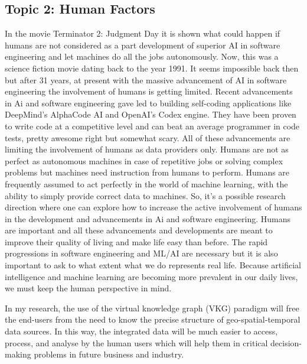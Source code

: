 \documentclass[10.9pt]{article}
\begin{document}
\subsection*{ Topic 2: Human Factors}
In the movie Terminator 2: Judgment Day it is shown what could happen if humans are not considered as a part development of superior AI in software engineering and let machines do all the jobs autonomously. Now, this was a science fiction movie dating back to the year 1991. It seems impossible back then but after 31 years, at present with the massive advancement of AI in software engineering the involvement of humans is getting limited. Recent advancements in Ai and software engineering gave led to building self-coding applications like DeepMind’s AlphaCode AI and OpenAI’s Codex engine. They have been proven to write code at a competitive level and can beat an average programmer in code tests, pretty awesome right but somewhat scary. All of these advancements are limiting the involvement of humans as data providers only. Humans are not as perfect as autonomous machines in case of repetitive jobs or solving complex problems but machines need instruction from humans to perform. Humans are frequently assumed to act perfectly in the world of machine learning, with the ability to simply provide correct data to machines. So, it’s a possible research direction where one can explore how to increase the active involvement of humans in the development and advancements in Ai and software engineering. Humans are important and all these advancements and developments are meant to improve their quality of living and make life easy than before. The rapid progressions in software engineering and ML/AI are necessary but it is also important to ask to what extent what we do represents real life. Because artificial intelligence and machine learning are becoming more prevalent in our daily lives, we must keep the human perspective in mind.

In my research, the use of the virtual knowledge graph (VKG) paradigm will free the end-users from the need to know the precise structure of geo-spatial-temporal data sources. In this way, the integrated data will be much easier to access, process, and analyse by the human users which will help them in critical decision-making problems in future business and industry. 
\end{document}
